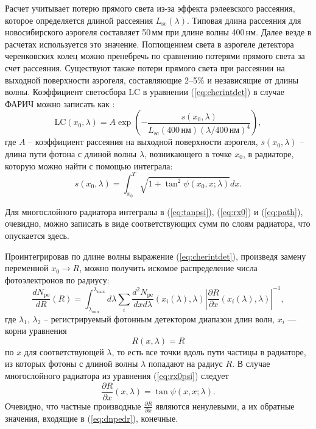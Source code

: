 \documentclass[12pt]{article}
\begin{document}
Расчет учитывает потерю прямого света из-за эффекта рэлеевского рассеяния, которое определяется длиной рассеяния $L_\textrm{sc}(\lambda)$.
Типовая длина рассеяния для новосибирского аэрогеля составляет 50\,мм при длине волны 400\,нм. Далее везде в расчетах используется это значение. 
Поглощением света в аэрогеле детектора черенковских колец можно пренебречь по сравнению потерями прямого света за счет рассеяния. Существуют также потери
прямого света при рассеянии на выходной поверхности аэрогеля, составляющие 2--5\% и независящие от длины волны.
Коэффициент светосбора $\mathrm{LC}$ в уравнении (\ref{eq:cherintdet}) в случае ФАРИЧ можно записать как \cite{aerscat}:
\[\mathrm{LC}(x_0,\lambda) = A \exp\left(-\frac{s(x_0,\lambda)}{L_\textrm{sc}(400\,\textrm{нм})\left(\lambda / 400\,\textrm{нм}\right)^4}\right),\]
где $A$ -- коэффициент рассеяния на выходной поверхности аэрогеля, $s(x_0,\lambda)$ -- длина пути фотона с длиной волны $\lambda$, 
возникающего в точке $x_0$, в радиаторе, которую можно найти с помощью интеграла:
\begin{equation}
s(x_0,\lambda) = \int_{x_0}^T \sqrt{1+\tan^2\psi(x_0,x;\lambda)} dx.
\label{eq:path}
\end{equation}

Для многослойного радиатора интегралы в (\ref{eq:tanpsi}), (\ref{eq:rx0}) и (\ref{eq:path}), очевидно, можно записать в виде соответствующих сумм по слоям радиатора, 
что опускается здесь.

Проинтегрировав по длине волны выражение (\ref{eq:cherintdet}), произведя замену переменной $x_0\to R$, можно получить искомое распределение числа фотоэлектронов по радиусу:
\begin{equation}
\frac{dN_\mathrm{pe}}{dR}(R) = \int_{\lambda_\mathrm{min}}^{\lambda_\mathrm{max}} d\lambda \sum_i \frac{d^2N_\mathrm{pe}}{dx d\lambda}(x_i(\lambda),\lambda)
\left|\frac{\partial R}{\partial x}(x_i(\lambda),\lambda)\right|^{-1},
\label{eq:dnpedr}
\end{equation}
где $\lambda_1,\,\lambda_2$ -- регистрируемый фотонным детектором диапазон длин волн, $x_i$ --- корни уравнения 
\[R(x,\lambda)=R\] 
по $x$ для соответствующей $\lambda$, то есть все точки вдоль пути частицы в радиаторе, из которых фотоны с длиной волны 
$\lambda$ попадают на радиус $R$. В случае многослойного радиатора из уравнения (\ref{eq:rx0psi}) следует
\[\frac{\partial R}{\partial x}(x,\lambda) = \tan\psi(x,x;\lambda).\]
Очевидно, что частные производные $\frac{\partial R}{\partial x}$ являются ненулевыми, а их обратные значения, входящие в (\ref{eq:dnpedr}), конечные. 
\end{document}
